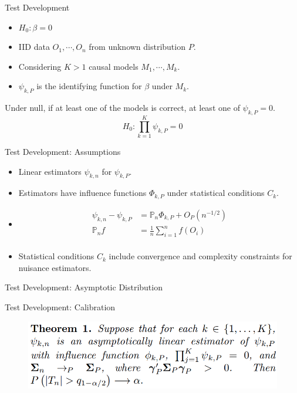 \documentclass{beamer}
\begin{document}
\begin{frame}{Test Development}
	\begin{itemize}
		\item $H_{0}: \beta = 0 $
		\item IID data $ O_1, \cdots, O_n $ from unknown distribution $ P $.
		\item Considering $ K > 1 $ causal models $ M_1, \cdots, M_k $.
		\item $ \psi_{k, P} $ is the identifying function for $ \beta $ under $ M_k $.
	\end{itemize}

	\vspace{2em}

	Under null, if at least one of the models is correct, at least one of $ \psi_{k, P} = 0 $.
	$$ H_0: \prod_{k=1}^{K} \psi_{k, P} = 0 $$
\end{frame}

\begin{frame}{Test Development: Assumptions}
	\begin{itemize}
		\item Linear estimators $ \psi_{k, n} $ for $ \psi_{k, P} $.
		\item Estimators have influence functions $ \Phi_{k, P} $ under statistical conditions $ C_k $.
		\item \begin{equation*} 
				\begin{split}
					\psi_{k, n} - \psi_{k, P} &= \mathbb{P}_n \Phi_{k, P} + O_{P}(n^{-1/2}) \\
					\mathbb{P}_n f &= \frac{1}{n} \sum_{i=1}^{n} f(O_i) \\
				\end{split}
		      \end{equation*}
		\item Statistical conditions $ C_k$ include convergence and complexity constraints for nuisance estimators.
	\end{itemize}
\end{frame}

\begin{frame}{Test Development: Asymptotic Distribution}
\end{frame}

\begin{frame}{Test Development: Calibration}
	\begin{figure}
		\center
		\includegraphics[scale=0.2]{theorem1.png}
	\end{figure}
\end{frame}
\end{document}
